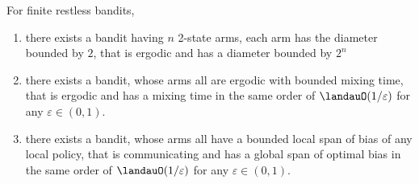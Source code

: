\begin{thm}
    For finite restless bandits,
    \begin{enumerate}[label=(\roman*)]
        \item \label{thm:diam} there exists a bandit having $n$ 2-state arms, each arm has the diameter bounded by $2$, that is ergodic and has a diameter bounded by $2^n$ %
        \item \label{thm:mixing} there exists a bandit, whose arms all are ergodic with bounded mixing time, that is ergodic and has a mixing time in the same order of $\landauO(1/\varepsilon)$ for any $\varepsilon\in(0,1)$.
        \item \label{thm:span} there exists a bandit, whose arms all have a bounded local span of bias of any local policy, that is communicating and has a global span of optimal bias in the same order of $\landauO(1/\varepsilon)$ for any $\varepsilon\in(0,1)$.
    \end{enumerate}
\end{thm}

